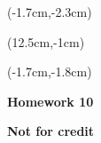 \documentclass[12pt, oneside]{article}
\begin{document}
\begin{textblock*}{4cm}(-1.7cm,-2.3cm)
\end{textblock*}

\begin{textblock*}{8cm}(12.5cm,-1cm)
\end{textblock*}
\begin{textblock*}{13.5cm}(-1.7cm,-1.8cm)
\end{textblock*}

\vspace{1cm}

\begin{center}
\textbf{\Large Homework 10}

\textbf{Not for credit}
\end{center}
\end{document}
